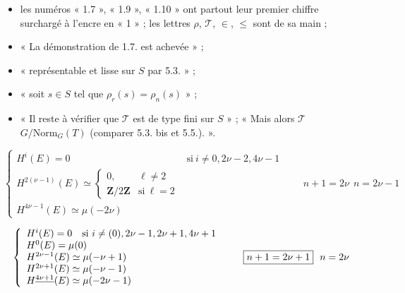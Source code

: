 \documentclass[11pt,a4paper]{article}
\begin{document}
\begin{itemize}
  \item les numéros « 1.7 », « 1.9 », « 1.10 » ont partout leur premier
  chiffre surchargé à l'encre en « 1 » ; les lettres $\rho$, $\mathcal{T}$,
  $\in$, $\leqslant$ sont de sa main ;
  \item «  La démonstration de 1.7. est achevée » ;
  \item « représentable et lisse sur $S$ par  5.3. » ;
  \item « soit $s \in S$ tel que  $\rho_r(s) =
  \rho_n(s)$ » ;
  \item « Il reste à vérifier que $\mathcal{T}$ est \struck{\ill{}} de type fini
  sur $S$ » ; « Mais alors $\mathcal{T}$  
  $G/\mathrm{Norm}_G(T)$ (comparer  5.3. bis et 5.5.). ».
\end{itemize}


\struck{\ill{}}

\[
  \left\{
  \begin{array}{ll}
    H^i(E) = 0 & \text{si}\ i \neq 0, 2\nu - 2, 4\nu - 1 \\[4pt]
    H^{2(\nu-1)}(E) \simeq
      \left\{ \begin{array}{ll} 0, & \ell \neq 2 \\ \mathbf{Z}/2\mathbf{Z} & \text{si}\ \ell = 2 \end{array} \right. \\[10pt]
    H^{4\nu-1}(E) \simeq \mu(-2\nu)
  \end{array}
  \right.
  \qquad \boxed{n + 1 = 2\nu} \ \ n = 2\nu - 1
\]

\[
  \left\{
  \begin{array}{l}
    H^i(E) = 0 \quad \text{si}\ i \neq (0), 2\nu - 1, 2\nu + 1, 4\nu + 1 \\
    H^0(E) = \mu(0) \\
    H^{2\nu-1}(E) \simeq \mu(-\nu+1) \\
    H^{2\nu+1}(E) \simeq \mu(-\nu-1) \\
    H^{\uncertain{4\nu+1}}(E) \simeq \mu(-2\nu-1)
  \end{array}
  \right.
  \qquad \boxed{n + 1 = 2\nu + 1} \ \ n = 2\nu
\]
\end{document}
